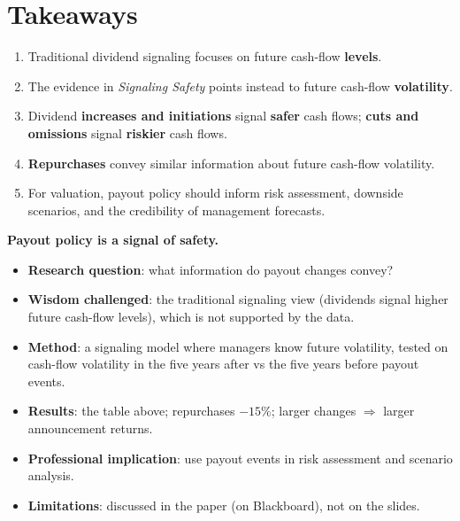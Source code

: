 \section{Takeaways}
\begin{enumerate}
  \item Traditional dividend signaling focuses on future cash-flow \textbf{levels}.
  \item The evidence in \emph{Signaling Safety} points instead to future cash-flow \textbf{volatility}.
  \item Dividend \textbf{increases and initiations} signal \textbf{safer} cash flows; \textbf{cuts and omissions} signal \textbf{riskier} cash flows.
  \item \textbf{Repurchases} convey similar information about future cash-flow volatility.
  \item For valuation, payout policy should inform risk assessment, downside scenarios, and the credibility of management forecasts.
\end{enumerate}
\begin{center}\large\textbf{Payout policy is a signal of safety.}\end{center}

\begin{addbox}
\begin{itemize}[leftmargin=*]
  \item \textbf{Research question}: what information do payout changes convey?
  \item \textbf{Wisdom challenged}: the traditional signaling view (dividends signal higher future cash-flow levels), which is not supported by the data.
  \item \textbf{Method}: a signaling model where managers know future volatility, tested on cash-flow volatility in the five years after vs the five years before payout events.
  \item \textbf{Results}: the table above; repurchases $-15\%$; larger changes $\Rightarrow$ larger announcement returns.
  \item \textbf{Professional implication}: use payout events in risk assessment and scenario analysis.
  \item \textbf{Limitations}: discussed in the paper (on Blackboard), not on the slides.
\end{itemize}
\end{addbox}

